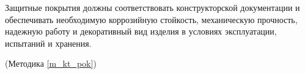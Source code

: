 Защитные покрытия должны соответствовать конструкторской документации и обеспечивать необходимую коррозийную стойкость, механическую прочность, надежную работу и декоративный вид изделия в условиях эксплуатации, испытаний и хранения.

\begin{flushright}
(Методика \ref{m_kt_pok})
\end{flushright}

